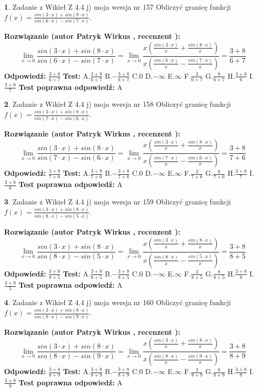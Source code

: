 \documentclass[12pt, a4paper]{article}
\theoremstyle{definition} %
\newtheorem{zad}{}
\newcommand{\zadStart}[1]{\begin{zad}#1\newline}
\newcommand{\zadStop}{\end{zad}}
\newcommand{\rozwStart}[2]{\noindent \textbf{Rozwiązanie (autor #1 , recenzent #2): }\newline}
\newcommand{\rozwStop}{\newline}
\newcommand{\odpStart}{\noindent \textbf{Odpowiedź:}\newline}
\newcommand{\odpStop}{\newline}
\newcommand{\testStart}{\noindent \textbf{Test:}\newline}
\newcommand{\testStop}{\newline}
\newcommand{\kluczStart}{\noindent \textbf{Test poprawna odpowiedź:}\newline}
\newcommand{\kluczStop}{\newline}
\begin{document}
\zadStart{Zadanie z Wikieł Z 4.4 j) moja wersja nr 157}
Obliczyć granicę funkcji $f(x)=\frac{sin(3\cdot x) +sin(8\cdot x)}{sin(6\cdot x) -sin(7\cdot x)}$.
\zadStop
\rozwStart{Patryk Wirkus}{}
$$\lim\limits_{x\to 0}\frac{sin(3\cdot x) +sin(8\cdot x)}{sin(6\cdot x) -sin(7\cdot x)}=\lim\limits_{x\to 0}\frac{x(\frac{sin(3\cdot x)}{x}+\frac{sin(8\cdot x)}{x})}{x(\frac{sin(6\cdot x)}{x}-\frac{sin(7\cdot x)}{x})}=\frac{3+8}{6+7}$$
\rozwStop
\odpStart
$\frac{3+8}{6+7}$
\odpStop
\testStart
A.$\frac{3+8}{6+7}$
B.$-\frac{3+8}{6+7}$
C.$0$
D.$-\infty$
E.$\infty$
F.$\frac{3}{6+7}$
G.$\frac{8}{6+7}$
H.$\frac{3+8}{6}$
I.$\frac{3+8}{7}$
\testStop
\kluczStart
A
\kluczStop



\zadStart{Zadanie z Wikieł Z 4.4 j) moja wersja nr 158}
Obliczyć granicę funkcji $f(x)=\frac{sin(3\cdot x) +sin(8\cdot x)}{sin(7\cdot x) -sin(6\cdot x)}$.
\zadStop
\rozwStart{Patryk Wirkus}{}
$$\lim\limits_{x\to 0}\frac{sin(3\cdot x) +sin(8\cdot x)}{sin(7\cdot x) -sin(6\cdot x)}=\lim\limits_{x\to 0}\frac{x(\frac{sin(3\cdot x)}{x}+\frac{sin(8\cdot x)}{x})}{x(\frac{sin(7\cdot x)}{x}-\frac{sin(6\cdot x)}{x})}=\frac{3+8}{7+6}$$
\rozwStop
\odpStart
$\frac{3+8}{7+6}$
\odpStop
\testStart
A.$\frac{3+8}{7+6}$
B.$-\frac{3+8}{7+6}$
C.$0$
D.$-\infty$
E.$\infty$
F.$\frac{3}{7+6}$
G.$\frac{8}{7+6}$
H.$\frac{3+8}{7}$
I.$\frac{3+8}{6}$
\testStop
\kluczStart
A
\kluczStop



\zadStart{Zadanie z Wikieł Z 4.4 j) moja wersja nr 159}
Obliczyć granicę funkcji $f(x)=\frac{sin(3\cdot x) +sin(8\cdot x)}{sin(8\cdot x) -sin(5\cdot x)}$.
\zadStop
\rozwStart{Patryk Wirkus}{}
$$\lim\limits_{x\to 0}\frac{sin(3\cdot x) +sin(8\cdot x)}{sin(8\cdot x) -sin(5\cdot x)}=\lim\limits_{x\to 0}\frac{x(\frac{sin(3\cdot x)}{x}+\frac{sin(8\cdot x)}{x})}{x(\frac{sin(8\cdot x)}{x}-\frac{sin(5\cdot x)}{x})}=\frac{3+8}{8+5}$$
\rozwStop
\odpStart
$\frac{3+8}{8+5}$
\odpStop
\testStart
A.$\frac{3+8}{8+5}$
B.$-\frac{3+8}{8+5}$
C.$0$
D.$-\infty$
E.$\infty$
F.$\frac{3}{8+5}$
G.$\frac{8}{8+5}$
H.$\frac{3+8}{8}$
I.$\frac{3+8}{5}$
\testStop
\kluczStart
A
\kluczStop



\zadStart{Zadanie z Wikieł Z 4.4 j) moja wersja nr 160}
Obliczyć granicę funkcji $f(x)=\frac{sin(3\cdot x) +sin(8\cdot x)}{sin(8\cdot x) -sin(9\cdot x)}$.
\zadStop
\rozwStart{Patryk Wirkus}{}
$$\lim\limits_{x\to 0}\frac{sin(3\cdot x) +sin(8\cdot x)}{sin(8\cdot x) -sin(9\cdot x)}=\lim\limits_{x\to 0}\frac{x(\frac{sin(3\cdot x)}{x}+\frac{sin(8\cdot x)}{x})}{x(\frac{sin(8\cdot x)}{x}-\frac{sin(9\cdot x)}{x})}=\frac{3+8}{8+9}$$
\rozwStop
\odpStart
$\frac{3+8}{8+9}$
\odpStop
\testStart
A.$\frac{3+8}{8+9}$
B.$-\frac{3+8}{8+9}$
C.$0$
D.$-\infty$
E.$\infty$
F.$\frac{3}{8+9}$
G.$\frac{8}{8+9}$
H.$\frac{3+8}{8}$
I.$\frac{3+8}{9}$
\testStop
\kluczStart
A
\kluczStop
\end{document}
